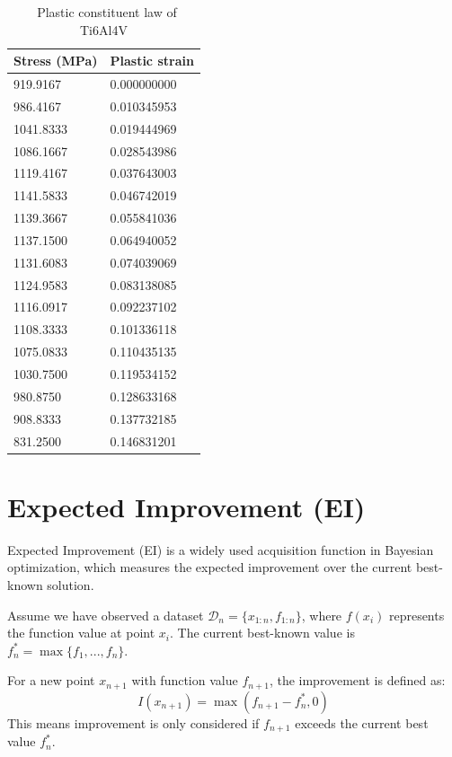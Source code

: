 \documentclass[preprint,review,12pt,authoryear]{elsarticle}
\begin{document}
\begin{table}
\centering
\caption{~Plastic constituent law of Ti6Al4V\citep{Peng2023}}
\begin{tabularx}{0.8\textwidth}{XX}
\toprule
Stress (MPa) & Plastic strain \\
\midrule
919.9167 & 0.000000000 \\
986.4167 & 0.010345953 \\
1041.8333 & 0.019444969 \\
1086.1667 & 0.028543986 \\
1119.4167 & 0.037643003 \\
1141.5833 & 0.046742019 \\
1139.3667 & 0.055841036 \\
1137.1500 & 0.064940052 \\
1131.6083 & 0.074039069 \\
1124.9583 & 0.083138085 \\
1116.0917 & 0.092237102 \\
1108.3333 & 0.101336118 \\
1075.0833 & 0.110435135 \\
1030.7500 & 0.119534152 \\
980.8750 & 0.128633168 \\
908.8333 & 0.137732185 \\
831.2500 & 0.146831201 \\
\bottomrule
\end{tabularx}
\label{tab:s1}
\end{table}

\section{Expected Improvement (EI)}
Expected Improvement (EI) is a widely used acquisition function in Bayesian optimization, which measures the expected improvement over the current best-known solution.

Assume we have observed a dataset $\mathcal{D}_n=\{x_{1:n},f_{1:n}\}$, where $f(x_i)$ represents the function value at point $x_i$. The current best-known value is $f^*_n=\max\{f_1,...,f_n\}$.

For a new point $x_{n+1}$ with function value $f_{n+1}$, the improvement is defined as:
\begin{equation}
    I(x_{n+1})=\max(f_{n+1}-f^*_n,0)
\end{equation}
This means improvement is only considered if $f_{n+1}$ exceeds the current best value $f^*_n$.
\end{document}
